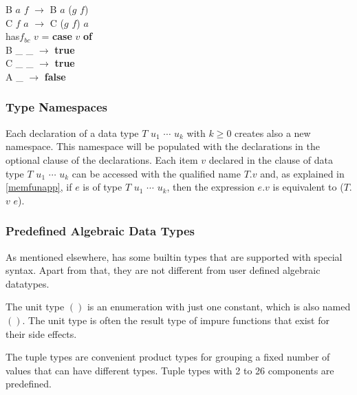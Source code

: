 {\begin{flushleft}
\hspace{0.5in}B $a$ $f$ $\rightarrow$ B $a$ ($g$ $f$)\\
\hspace{0.5in}C $f$ $a$ $\rightarrow$ C ($g$ $f$) $a$\\
\hspace{0.3in}has$f_{bc}$ $v$ = \textbf{case} $v$ \textbf{of}\\
\hspace{0.5in}B \_ \_ $\rightarrow$ \textbf{true}\\
\hspace{0.5in}C \_ \_ $\rightarrow$ \textbf{true}\\
\hspace{0.5in}A \_   $\rightarrow$ \textbf{false}
\end{flushleft}
}

\subsubsection{Type Namespaces}

Each declaration of a data type $T$ $u_1$ $\cdots$ $u_k$ with $k \ge 0$ creates also a new namespace. 
This namespace will be populated with the declarations in the optional  clause of the  declarations.
Each item $v$ declared in the  clause of data type $T$ $u_1$ $\cdots$ $u_k$  can be accessed with the qualified name $T$.$v$ and, 
as explained in \autoref{memfunapp}, 
if $e$ is of type $T$ $u_1$ $\cdots$ $u_k$, 
then the expression $e$.$v$ is equivalent to ($T$.$v$ $e$).

\subsubsection{Predefined Algebraic Data Types} \label{predef}

As mentioned elsewhere, \frege{} has some builtin types that are supported with special syntax. Apart from that, they are not different from user defined algebraic datatypes.

\label{unittype}
The unit type $()$ is an enumeration with just one constant, which is also named $()$. The unit type is often the result type of impure functions that exist for their side effects.

\label{tupletypes} 
The tuple types are convenient product types for grouping a fixed number of  values that can have different types. Tuple types with 2 to 26 components are predefined.

